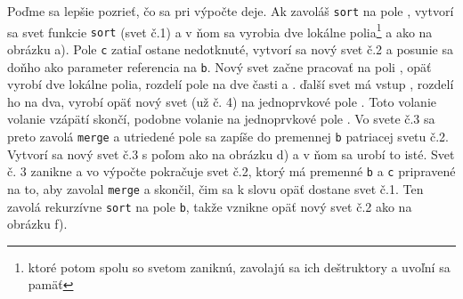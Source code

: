 \documentclass[10pt]{article}
\def\ods{\vspace*{10pt}}
\begin{document}
\ods Poďme sa lepšie pozrieť, čo sa pri výpočte deje.
Ak zavoláš {\tt sort} na pole 
, vytvorí sa  svet funkcie {\tt sort} (svet č.1) a v ňom
sa vyrobia dve lokálne polia\footnote{ktoré potom spolu so svetom zaniknú, zavolajú
sa ich deštruktory a uvoľní sa pamäť}
 a  ako na obrázku a). 
Pole {\tt c} zatiaľ ostane nedotknuté, vytvorí sa nový svet č.2 a posunie sa 
doňho ako parameter
referencia na {\tt b}. Nový svet začne pracovať na poli , opäť
vyrobí dve lokálne polia, rozdelí pole na dve časti  a .
ďalší svet má vstup , rozdelí ho na dva, vyrobí opäť nový svet (už č. 4) 
na jednoprvkové pole . Toto volanie volanie vzápätí skončí, podobne
volanie na jednoprvkové pole . Vo svete č.3 sa preto zavolá {\tt merge}
a utriedené pole  sa zapíše do premennej {\tt b} patriacej svetu č.2.
Vytvorí sa nový svet č.3 s poľom  ako na obrázku d) a v ňom sa urobí to isté.
Svet č. 3 zanikne a vo výpočte pokračuje svet č.2, ktorý má premenné {\tt b} a {\tt c}
pripravené na to, aby zavolal {\tt merge} a skončil, čim sa k slovu opäť dostane svet č.1.
Ten zavolá rekurzívne {\tt sort} na pole {\tt b}, takže vznikne opäť nový svet č.2
ako na obrázku f).
\end{document}
